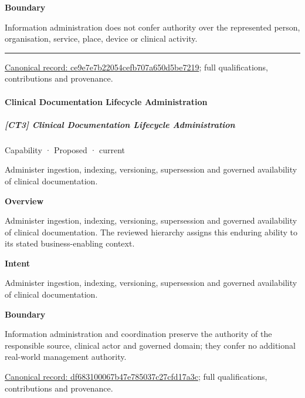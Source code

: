 \textbf{Boundary}



Information administration does not confer authority over the represented person, organisation, service, place, device or clinical activity.



\medskip\hrule\medskip

{\footnotesize \href{../../../../continuum/strategy/capability/ce9e7e7b22054cefb707a650d5be7219.md}{Canonical record: ce9e7e7b22054cefb707a650d5be7219}; full qualifications, contributions and provenance.}\par
\paragraph{Clinical Documentation Lifecycle Administration}

\subparagraph{[CT3] Clinical Documentation Lifecycle Administration}

\label{element:df683100067b47e785037c27cfd17a3c}
{\small Capability · Proposed · current}\par

Administer ingestion, indexing, versioning, supersession and governed availability of clinical documentation.



\textbf{Overview}



Administer ingestion, indexing, versioning, supersession and governed availability of clinical documentation. The reviewed hierarchy assigns this enduring ability to its stated business-enabling context.



\textbf{Intent}



Administer ingestion, indexing, versioning, supersession and governed availability of clinical documentation.



\textbf{Boundary}



Information administration and coordination preserve the authority of the responsible source, clinical actor and governed domain; they confer no additional real-world management authority.


{\footnotesize \href{../../../../continuum/strategy/capability/df683100067b47e785037c27cfd17a3c.md}{Canonical record: df683100067b47e785037c27cfd17a3c}; full qualifications, contributions and provenance.}\par
